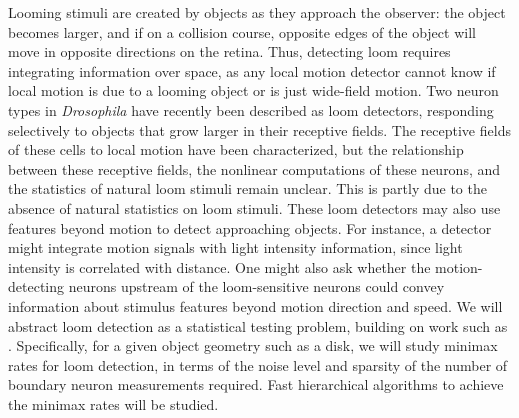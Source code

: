 Looming stimuli are created by objects as they approach the observer:
the object becomes larger, and if on a collision course,
opposite edges of the object will move in opposite directions on the
retina. Thus, detecting loom requires integrating information over
space, as any local motion detector cannot know if local motion is due
to a looming object or is just wide-field motion. Two neuron types in
\textit{Drosophila} have recently been described as loom detectors,
responding selectively to objects that grow larger in their receptive
fields. The receptive fields of these cells to local motion have been
characterized, but the relationship between these receptive fields,
the nonlinear computations of these neurons, and the statistics of
natural loom stimuli remain unclear. This is partly due to the
absence of natural statistics on loom stimuli. These loom detectors 
may also use features beyond motion to
detect approaching objects. For instance, a detector might integrate
motion signals with light intensity information, since light intensity
is correlated with distance. One might also ask whether the
motion-detecting neurons upstream of the loom-sensitive neurons could
convey information about stimulus features beyond motion
direction and speed. We will abstract loom detection as a statistical
testing problem, building on work such
as \citep{castro:05,huo:06,hc:04}. Specifically, for a given object
geometry such as a disk, we will study minimax rates for loom
detection, in terms of the noise level and sparsity of the number of
boundary neuron measurements required. Fast hierarchical algorithms
to achieve the minimax rates will be studied.



